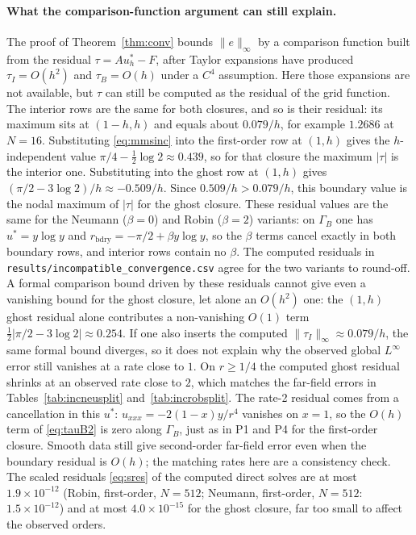 \documentclass[11pt,a4paper]{article}
\theoremstyle{palplain}
\theoremstyle{paldef}
\theoremstyle{palremark}
\newcommand{\GB}{\Gamma_B}
\begin{document}
\paragraph{What the comparison-function argument can still explain.}
The proof of Theorem~\ref{thm:conv} bounds $\|e\|_\infty$ by a comparison function built
from the residual $\tau=Au^*_h-F$, after Taylor expansions have produced
$\tau_I=O(h^2)$ and $\tau_B=O(h)$ under a $C^4$ assumption. Here those expansions are not
available, but $\tau$ can still be computed as the residual of the grid function. The
interior rows are the same for both closures, and so is their residual: its maximum sits at
$(1-h,h)$ and equals about $0.079/h$, for example $1.2686$ at $N=16$. Substituting
\eqref{eq:mmsinc} into the first-order row at $(1,h)$ gives the $h$-independent value
$\pi/4-\frac12\log 2\approx0.439$, so for that closure the maximum $|\tau|$ is the interior
one.
Substituting into the ghost row at $(1,h)$ gives
$(\pi/2-3\log 2)/h\approx-0.509/h$. Since $0.509/h>0.079/h$, this boundary value is the nodal
maximum of $|\tau|$ for the ghost closure. These residual values are the same for the
Neumann ($\beta=0$) and Robin ($\beta=2$) variants: on $\GB$ one has $u^*=y\log y$ and
$r_{\mathrm{bdry}}=-\pi/2+\beta y\log y$, so the $\beta$ terms cancel exactly in both boundary
rows, and interior rows contain no $\beta$. The computed residuals in
\texttt{results/incompatible\_convergence.csv} agree for the two variants to round-off.
A formal comparison bound driven by these residuals cannot give even a vanishing bound for
the ghost closure, let alone an $O(h^2)$ one: the $(1,h)$ ghost residual alone contributes a non-vanishing $O(1)$ term
$\frac12\bigl|\pi/2-3\log 2\bigr|\approx0.254$. If one also inserts the computed
$\|\tau_I\|_\infty\approx0.079/h$, the same formal bound diverges, so it does not explain
why the observed global $L^\infty$ error still vanishes at a rate close to $1$.
On $r\ge 1/4$ the computed ghost residual shrinks at an observed rate close to $2$, which
matches the far-field errors in Tables~\ref{tab:incneusplit} and~\ref{tab:incrobsplit}. The
rate-2 residual comes from a cancellation in this $u^*$: $u_{xxx}=-2(1-x)y/r^4$ vanishes on
$x=1$, so the $O(h)$ term of \eqref{eq:tauB2} is zero along $\GB$, just as in P1 and P4 for the
first-order closure. Smooth data still give second-order far-field error even when the boundary
residual is $O(h)$; the matching rates here are a consistency check.
The scaled residuals \eqref{eq:sres} of the computed direct solves are at most
$1.9\times10^{-12}$ (Robin, first-order, $N=512$; Neumann, first-order, $N=512$:
$1.5\times10^{-12}$) and at most $4.0\times10^{-15}$ for the ghost closure, far too small to
affect the observed orders.
\end{document}
